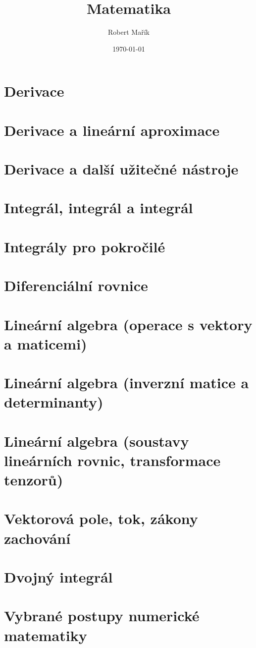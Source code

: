 \documentclass[twocolumn]{report}
\title{Matematika}
\author{Robert Mařík}
\date{\today}
\begin{document}
\maketitle


\tableofcontents

\chapter{Derivace}


\chapter{Derivace a lineární aproximace}


\chapter{Derivace a další užitečné nástroje}


\chapter{Integrál, integrál a integrál}


\chapter{Integrály pro pokročilé}


\chapter{Diferenciální rovnice}


\chapter{Lineární algebra (operace s vektory a maticemi)}


\chapter{Lineární algebra (inverzní matice a determinanty)}


\chapter{Lineární algebra (soustavy lineárních rovnic, transformace tenzorů)}


\chapter{Vektorová pole, tok, zákony zachování}


\chapter{Dvojný integrál}


\chapter{Vybrané postupy numerické matematiky}


%
\end{document}
